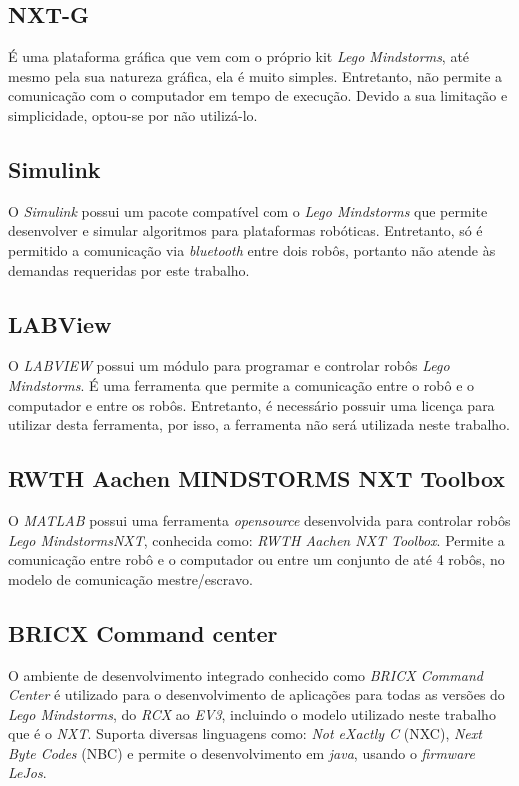 \subsection{NXT-G}
\label{subsec:nxtg}
É uma plataforma gráfica que vem com o próprio kit \emph{Lego Mindstorms\textregistered}, até mesmo pela sua natureza gráfica, ela é muito simples. Entretanto, não permite a comunicação com o computador em tempo de execução. Devido a sua limitação e simplicidade, optou-se por não utilizá-lo.

\subsection{Simulink}
\label{subsec:simulink}
O \emph{Simulink} possui um pacote compatível com o \emph{Lego Mindstorms\textregistered} que permite desenvolver e simular algoritmos para plataformas robóticas. Entretanto, só é permitido a comunicação via \emph{bluetooth} entre dois robôs, portanto não atende às demandas requeridas por este trabalho.  

\subsection{LABView}
\label{subsec:labview}
O \emph{LABVIEW} possui um módulo para programar e controlar robôs \emph{Lego Mindstorms\textregistered}. É uma ferramenta que permite a comunicação entre o robô e o computador e entre os robôs. Entretanto, é necessário possuir uma licença para utilizar desta ferramenta, por isso, a ferramenta não será utilizada neste trabalho.


\subsection{RWTH Aachen MINDSTORMS NXT Toolbox}
\label{subsec:rwth}
O \emph{MATLAB\textregistered} possui uma ferramenta \emph{opensource} desenvolvida para controlar robôs \emph{Lego Mindstorms\textregistered NXT}, conhecida como: \emph{RWTH Aachen NXT Toolbox}. Permite a comunicação entre robô e o computador ou entre um conjunto de até 4 robôs, no modelo de comunicação mestre/escravo. 

\subsection{BRICX Command center}
\label{subsec:Bricx}
O ambiente de desenvolvimento integrado conhecido como \emph{BRICX Command Center} é utilizado para o desenvolvimento de aplicações para todas as versões do \emph{Lego Mindstorms\textregistered}, do \emph{RCX} ao \emph{EV3}, incluindo o modelo utilizado neste trabalho que é o \emph{NXT}. Suporta diversas linguagens como: \emph{Not eXactly C} (NXC), \emph{Next Byte Codes} (NBC) e permite o desenvolvimento em \emph{java}, usando o \emph{firmware LeJos}. %

